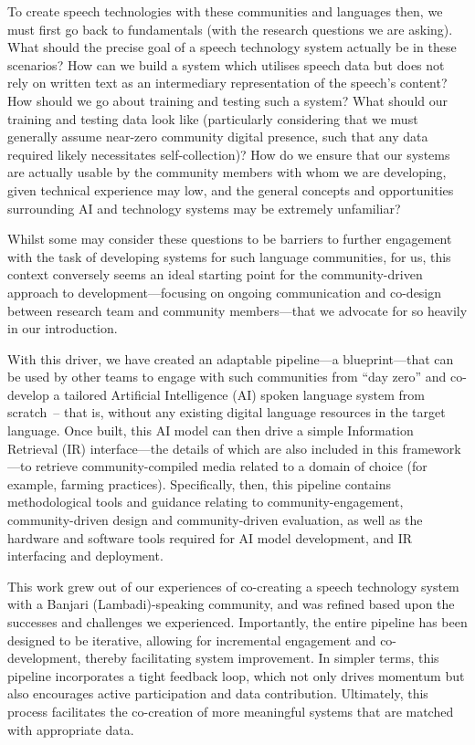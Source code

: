 \documentclass[10pt,twoside,openright]{report}
\begin{document}
To create speech technologies with these communities and languages then, we must first go back to fundamentals (with the research questions we are asking).
What should the precise goal of a speech technology system actually be in these scenarios?
How can we build a system which utilises speech data but does not rely on written text as an intermediary representation of the speech's content?
How should we go about training and testing such a system? What should our training and testing data look like (particularly considering that we must generally assume near-zero community digital presence, such that any data required likely necessitates self-collection)?
How do we ensure that our systems are actually usable by the community members with whom we are developing, given technical experience may low, and the general concepts and opportunities surrounding AI and technology systems may be extremely unfamiliar?

Whilst some may consider these questions to be barriers to further engagement with the task of developing systems for such language communities, for us, this context conversely seems an ideal starting point for the community-driven approach to development---focusing on ongoing communication and co-design between research team and community members---that we advocate for so heavily in our introduction. 

With this driver, we have created an adaptable pipeline---a blueprint---that can be used by other teams to engage with such communities from ``day zero'' and co-develop a tailored Artificial Intelligence (AI) spoken language system from scratch~-- that is, without any existing digital language resources in the target language.
Once built, this AI model can then drive a simple Information Retrieval (IR) interface---the details of which are also included in this framework---to retrieve community-compiled media related to a domain of choice (for example, farming practices).
Specifically, then, this pipeline contains methodological tools and guidance relating to community-engagement, community-driven design and community-driven evaluation, as well as the hardware and software tools required for AI model development, and IR interfacing and deployment. 
 
This work grew out of our experiences of co-creating a speech technology system with a Banjari (Lambadi)-speaking community, and was refined based upon the successes and challenges we experienced.
Importantly, the entire pipeline has been designed to be iterative, allowing for incremental engagement and co-development, thereby facilitating system improvement.
In simpler terms, this pipeline incorporates a tight feedback loop, which not only drives momentum but also encourages active participation and data contribution.
Ultimately, this process facilitates the co-creation of more meaningful systems that are matched with appropriate data.
\end{document}
